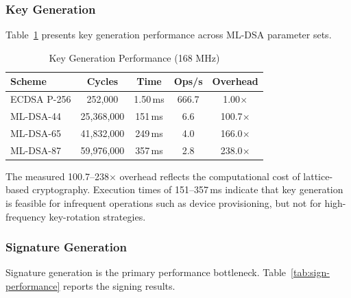 \documentclass[final, twoside]{IEEEtran} %
\begin{document}
\subsubsection{Key Generation}

Table~\ref{tab:keygen-performance} presents key generation performance across ML-DSA parameter sets.

\begin{table}[h]
	\centering
	\caption{Key Generation Performance (168 MHz)}
	\label{tab:keygen-performance}
	\begin{tabular}{lcccc}
		\toprule
		\textbf{Scheme} & \textbf{Cycles} & \textbf{Time} & \textbf{Ops/s} & \textbf{Overhead} \\
		\midrule
		ECDSA P-256     & 252,000         & 1.50\,ms      & 666.7          & 1.00$\times$      \\
		ML-DSA-44       & 25,368,000      & 151\,ms       & 6.6            & 100.7$\times$     \\
		ML-DSA-65       & 41,832,000      & 249\,ms       & 4.0            & 166.0$\times$     \\
		ML-DSA-87       & 59,976,000      & 357\,ms       & 2.8            & 238.0$\times$     \\
		\bottomrule
	\end{tabular}
\end{table}

The measured 100.7--238$\times$ overhead reflects the computational cost of lattice-based cryptography. Execution times of 151--357\,ms indicate that key generation is feasible for infrequent operations such as device provisioning, but not for high-frequency key-rotation strategies.

\subsubsection{Signature Generation}

Signature generation is the primary performance bottleneck. Table~\ref{tab:sign-performance} reports the signing results.
\end{document}
